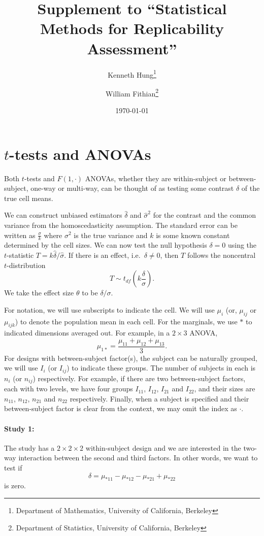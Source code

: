 \documentclass[11pt]{article}
\theoremstyle{definition}
\theoremstyle{custom}
\newcommand{\hdelta}{\hat{\delta}}
\newcommand{\hsigma}{\hat{\sigma}}
\begin{document}
\title{Supplement to ``Statistical Methods for Replicability Assessment''}
\date{\today}
\author{
  Kenneth Hung\thanks{Department of Mathematics, University of California, Berkeley} \and
  William Fithian\thanks{Department of Statistics, University of California, Berkeley}
}
\maketitle

\section{\texorpdfstring{$t$}{t}-tests and ANOVAs}

  Both $t$-tests and $F(1, \cdot)$ ANOVAs, whether they are within-subject or between-subject, one-way or multi-way, can be thought of as testing some contrast $\delta$ of the true cell means. 

  We can construct unbiased estimators $\hdelta$ and $\hsigma^2$ for the contrast and the common variance from the homoscedasticity assumption. The standard error can be written as $\frac{\sigma}{k}$ where $\sigma^2$ is the true variance and $k$ is some known constant determined by the cell sizes. We can now test the null hypothesis $\delta = 0$ using the $t$-statistic $T = k \hdelta / \hsigma$. If there is an effect, i.e.\ $\delta \ne 0$, then $T$ follows the noncentral $t$-distribution
  \[
    T \sim t_{df}\left(k\frac{\delta}{\sigma}\right).
  \]
  We take the effect size $\theta$ to be $\delta / \sigma$.

  For notation, we will use subscripts to indicate the cell. We will use $\mu_i$ (or, $\mu_{ij}$ or $\mu_{ijk}$) to denote the population mean in each cell. For the marginals, we use $*$ to indicated dimensions averaged out. For example, in a $2 \times 3$ ANOVA,
  \[
    \mu_{1*} = \frac{\mu_{11} + \mu_{12} + \mu_{13}}{3}.
  \]
  For designs with between-subject factor(s), the subject can be naturally grouped, we will use $I_i$ (or $I_{ij}$) to indicate these groups. The number of subjects in each is $n_i$ (or $n_{ij}$) respectively. For example, if there are two between-subject factors, each with two levels, we have four groups $I_{11}$, $I_{12}$, $I_{21}$ and $I_{22}$, and their sizes are $n_{11}$, $n_{12}$, $n_{21}$ and $n_{22}$ respectively.
  Finally, when a subject is specified and their between-subject factor is clear from the context, we may omit the index as $\cdot$.

  \paragraph{Study 1: \citet{Roelofs:2008ik}}
  The study has a $2 \times 2 \times 2$ within-subject design and we are interested in the two-way interaction between the second and third factors. In other words, we want to test if
  \[
  \delta = \mu_{*11} - \mu_{*12} - \mu_{*21} + \mu_{*22}
  \]
  is zero.
\end{document}
